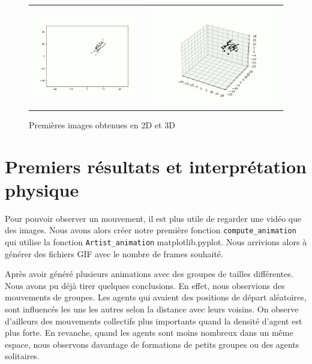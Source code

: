 \documentclass[french, a4paper, 12pt, openany]{report}
\begin{document}
	\begin{figure}[!h]
		\centering
		\begin{tabular}{cc}
			\includegraphics[width=8cm]{images/image_2.png} & \includegraphics[width=10cm]{images/image_1.png} \\
		\end{tabular}
		\caption{Premières images obtenues en 2D et 3D }
	\end{figure} 

\section{Premiers résultats et interprétation physique}

   Pour pouvoir observer un mouvement, il est plus utile de regarder une vidéo que des images. Nous avons alors créer notre première fonction \verb|compute_animation| qui utilise la fonction \verb|Artist_animation| matplotlib.pyplot. Nous arrivions alors à générer des fichiers GIF avec le nombre de frames souhaité.
   
   Après avoir généré plusieurs animations avec des groupes de tailles différentes. Nous avons pu déjà tirer quelques conclusions. En effet, nous observions des mouvements de groupes. Les agents qui avaient des positions de départ aléatoires, sont influencés les uns les autres selon la distance avec leurs voisins. On observe d'ailleurs des mouvements collectifs plus importants quand la densité d'agent est plus forte. En revanche, quand les agents sont moins nombreux dans un même espace, nous observons davantage de formations de petits groupes ou des agents solitaires. 
   
\end{document}
